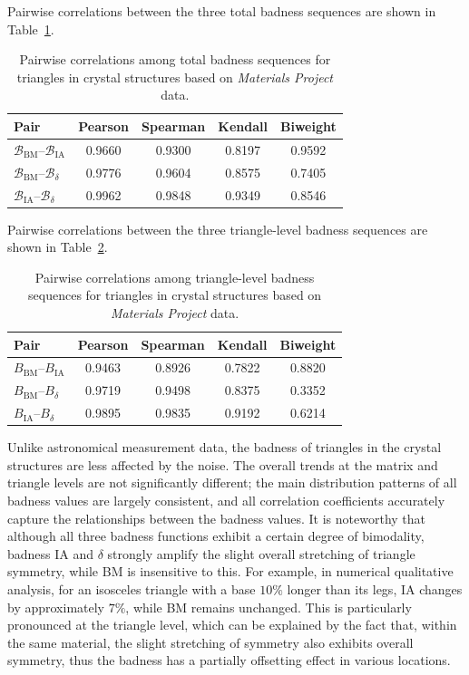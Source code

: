\documentclass[11pt]{article}
\begin{document}
Pairwise correlations between the three total badness sequences are shown in Table~\ref{tab:MP_matrix_corr}.
\begin{table}[h!]
\centering
\caption{Pairwise correlations among total badness sequences for triangles in crystal structures based on \textit{Materials Project} data.}
\label{tab:MP_matrix_corr}
\small
\setlength{\tabcolsep}{7pt}
\begin{tabular}{lcccc}
\hline
Pair & Pearson & Spearman & Kendall & Biweight \\
\hline
\(\mathcal{B}_{\mathrm{BM}}\)--\(\mathcal{B}_{\mathrm{IA}}\) & 0.9660 & 0.9300 & 0.8197 & 0.9592 \\
\(\mathcal{B}_{\mathrm{BM}}\)--\(\mathcal{B}_{\delta}\) & 0.9776 & 0.9604 & 0.8575 & 0.7405 \\
\(\mathcal{B}_{\mathrm{IA}}\)--\(\mathcal{B}_{\delta}\) & 0.9962 & 0.9848 & 0.9349 & 0.8546 \\
\hline
\end{tabular}
\end{table}

Pairwise correlations between the three triangle-level badness sequences are shown in Table~\ref{tab:MP_triangle_corr}.
\begin{table}[h!]
\centering
\caption{Pairwise correlations among triangle-level badness sequences for triangles in crystal structures based on \textit{Materials Project} data.}
\label{tab:MP_triangle_corr}
\small
\setlength{\tabcolsep}{7pt}
\begin{tabular}{lcccc}
\hline
Pair & Pearson & Spearman & Kendall & Biweight \\
\hline
\({B}_{\mathrm{BM}}\)--\({B}_{\mathrm{IA}}\) & 0.9463 & 0.8926 & 0.7822 & 0.8820 \\
\({B}_{\mathrm{BM}}\)--\({B}_{\delta}\) & 0.9719 & 0.9498 & 0.8375 & 0.3352 \\
\({B}_{\mathrm{IA}}\)--\({B}_{\delta}\) & 0.9895 & 0.9835 & 0.9192 & 0.6214 \\
\hline
\end{tabular}
\end{table}

Unlike astronomical measurement data, the badness of triangles in the crystal structures are less affected by the noise. The overall trends at the matrix and triangle levels are not significantly different; the main distribution patterns of all badness values are largely consistent, and all correlation coefficients accurately capture the relationships between the badness values. It is noteworthy that although all three badness functions exhibit a certain degree of bimodality, badness IA and \(\delta\) strongly amplify the slight overall stretching of triangle symmetry, while BM is insensitive to this. For example, in numerical qualitative analysis, for an isosceles triangle with a base \(10\%\) longer than its legs, IA changes by approximately \(7\%\), while BM remains unchanged.
This is particularly pronounced at the triangle level, which can be explained by the fact that, within the same material, the slight stretching of symmetry also exhibits overall symmetry, thus the badness has a partially offsetting effect in various locations.
\end{document}
